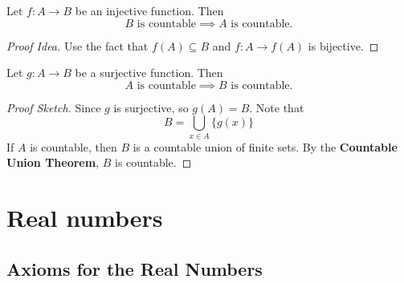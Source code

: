 \documentclass[
	UTF-8,
	11pt, %
	a4paper, %
]{LegrandOrangeBook}
\begin{document}
    \begin{theorem}
    Let $f: A \to B$ be an injective function. Then
    \[ B \text{ is countable} \implies A \text{ is countable.} \]
    \end{theorem}

    \begin{proof}[Proof Idea]
    Use the fact that $f(A) \subseteq B$ and $f: A \to f(A)$ is bijective.
    \end{proof}

    \begin{theorem} 
    Let $g: A \to B$ be a surjective function. Then
    \[ A \text{ is countable} \implies B \text{ is countable.} \]
    \end{theorem}

    \begin{proof}[Proof Sketch]
    Since $g$ is surjective, so $g(A) = B$. Note that 
    \[ B = \bigcup_{x \in A} \{ g(x) \} \]
    If $A$ is countable, then $B$ is a countable union of finite sets. By the \textbf{Countable Union Theorem}, $B$ is countable.
    \end{proof}

    \newpage

    \chapter{Real numbers}

    
    \section{Axioms for the Real Numbers}
\end{document}
